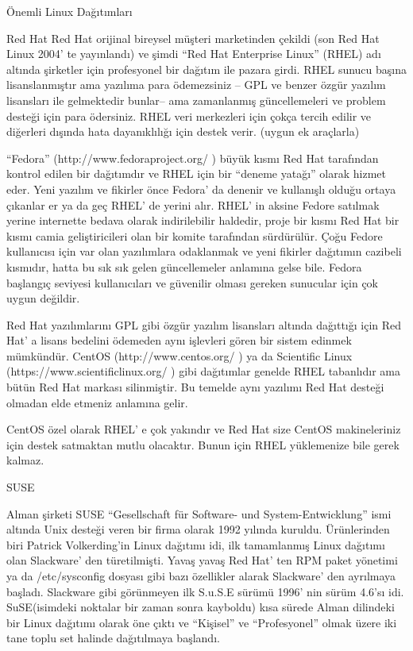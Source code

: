 \begin{section}{Önemli Linux Dağıtımları}
\begin{subsection}{Red Hat}
Red Hat orijinal bireysel müşteri marketinden çekildi (son Red Hat Linux 2004' te yayınlandı) ve şimdi “Red Hat Enterprise Linux” (RHEL) adı altında şirketler için profesyonel bir dağıtım ile pazara girdi. RHEL sunucu başına lisanslanmıştır ama yazılıma para ödemezsiniz – GPL ve benzer özgür yazılım lisansları ile gelmektedir bunlar-- ama zamanlanmış güncellemeleri ve problem desteği için para ödersiniz. RHEL veri merkezleri için çokça tercih edilir ve diğerleri dışında hata dayanıklılığı için destek verir. (uygun ek araçlarla)

“Fedora” (http://www.fedoraproject.org/ ) büyük kısmı Red Hat tarafından kontrol edilen bir dağıtımdır ve RHEL için bir “deneme yatağı” olarak hizmet eder. Yeni yazılım ve fikirler önce Fedora' da denenir ve kullanışlı olduğu ortaya çıkanlar er ya da geç RHEL' de yerini alır. RHEL' in aksine Fedore satılmak yerine internette bedava olarak indirilebilir haldedir, proje bir kısmı Red Hat bir kısmı camia geliştiricileri olan bir komite tarafından sürdürülür. Çoğu Fedore kullanıcısı için var olan yazılımlara odaklanmak ve yeni fikirler dağıtımın cazibeli kısmıdır, hatta bu sık sık gelen güncellemeler anlamına gelse bile. Fedora başlangıç seviyesi kullanıcıları ve güvenilir olması gereken sunucular için çok uygun değildir.

Red Hat yazılımlarını GPL gibi özgür yazılım lisansları altında dağıttığı için Red Hat' a lisans bedelini ödemeden aynı işlevleri gören bir sistem edinmek mümkündür. CentOS (http://www.centos.org/ ) ya da Scientific Linux (https://www.scientificlinux.org/ ) gibi dağıtımlar genelde RHEL tabanlıdır ama bütün Red Hat markası silinmiştir. Bu temelde aynı yazılımı Red Hat desteği olmadan elde etmeniz anlamına gelir.

CentOS özel olarak RHEL' e çok yakındır ve Red Hat size CentOS makineleriniz için destek satmaktan mutlu olacaktır. Bunun için RHEL yüklemenize bile gerek kalmaz.

\end{subsection}
\begin{subsection}{SUSE}

Alman şirketi SUSE “Gesellschaft für Software- und System-Entwicklung” ismi altında Unix desteği veren bir firma olarak 1992 yılında kuruldu. Ürünlerinden biri Patrick Volkerding’in Linux dağıtımı idi, ilk tamamlanmış Linux dağıtımı olan Slackware' den türetilmişti. Yavaş yavaş Red Hat' ten RPM paket yönetimi ya da /etc/sysconfig dosyası gibi bazı özellikler alarak Slackware' den ayrılmaya başladı. Slackware gibi görünmeyen ilk S.u.S.E sürümü 1996' nin sürüm 4.6'sı idi. SuSE(isimdeki noktalar bir zaman sonra kayboldu) kısa sürede Alman dilindeki bir Linux dağıtımı olarak öne çıktı ve “Kişisel” ve “Profesyonel” olmak üzere iki tane toplu set halinde dağıtılmaya başlandı.


\end{subsection}
\end{section}

